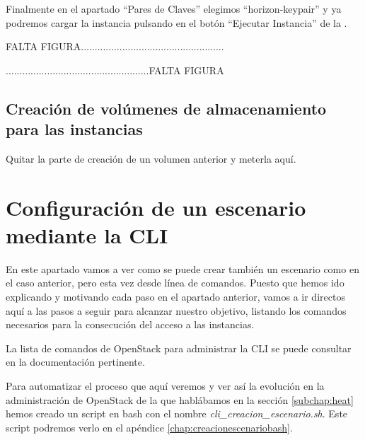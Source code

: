 Finalmente en el apartado “Pares de Claves” elegimos “horizon-keypair” y ya podremos cargar la instancia pulsando en el botón “Ejecutar Instancia” de la %
.


\begin{tcolorbox}[colback=green!5!white,colframe=green!75!black]
FALTA FIGURA....................................................

....................................................FALTA FIGURA
\end{tcolorbox}

\subsection{Creación de volúmenes de almacenamiento para las instancias}
\begin{tcolorbox}[colback=red!5!red,colframe=red!75!black]
Quitar la parte de creación de un volumen anterior y meterla aquí.
\end{tcolorbox}



\section{Configuración de un escenario mediante la CLI}
En este apartado vamos a ver como se puede crear también un escenario como en el caso anterior, pero esta vez desde línea de comandos. Puesto que hemos ido explicando y motivando cada paso en el apartado anterior, vamos a ir directos aquí a las pasos a seguir para alcanzar nuestro objetivo, listando los comandos necesarios para la consecución del acceso a las instancias.

La lista de comandos de OpenStack para administrar la CLI se puede consultar en la documentación pertinente.\cite{noauthor_command_nodate}

Para automatizar el proceso que aquí veremos y ver así la evolución en la administración de OpenStack de la que hablábamos en la sección \ref{subchap:heat} hemos creado un script en bash con el nombre \textit{cli\_creacion\_escenario.sh}. Este script podremos verlo en el apéndice \ref{chap:creacionescenariobash}.

